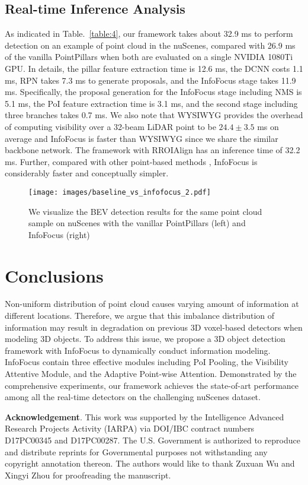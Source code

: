 \documentclass[runningheads]{llncs}
\begin{document}
\subsection{Real-time Inference Analysis}
As indicated in Table.~\ref{table:4}, our framework takes about 32.9 ms to perform detection on an example of point cloud in the nuScenes, compared with 26.9 ms of the vanilla PointPillars when both are evaluated on a single NVIDIA 1080Ti GPU. In details, the pillar feature extraction time is 12.6 ms, the DCNN costs 1.1 ms, RPN takes 7.3 ms to generate proposals, and the InfoFocus stage takes 11.9 ms. Specifically, the proposal generation for the InfoFocus stage including NMS is 5.1 ms, the PoI feature extraction time is 3.1 ms, and the second stage including three branches takes 0.7 ms. We also note that WYSIWYG \cite{hu2019you} provides the overhead of computing visibility over a 32-beam LiDAR point to be $24.4 \pm 3.5$ ms on average and InfoFocus is faster than WYSIWYG \cite{hu2019you} since we share the similar backbone network. The framework with RROIAlign has an inference time of 32.2 ms. Further, compared with other point-based methods \cite{shi2019pointrcnn,yang2019std}, InfoFocus is considerably faster and conceptually simpler. 

\begin{figure}[t]
\centering
  \texttt{[image: images/baseline\_vs\_infofocus\_2.pdf]}
  \\
  \caption{We visualize the BEV detection results for the same point cloud sample on nuScenes with the vanillar PointPillars (left) and InfoFocus (right)}
\label{fig:comparison}
\end{figure}

\section{Conclusions}
Non-uniform distribution of point cloud causes varying amount of information at different locations. Therefore, we argue that this imbalance distribution of information may result in degradation on previous 3D voxel-based detectors when modeling 3D objects. To address this issue, we propose a 3D object detection framework with InfoFocus to dynamically conduct information modeling. InfoFocus contain three effective modules including PoI Pooling, the Visibility Attentive Module, and the Adaptive Point-wise Attention. Demonstrated by the comprehensive experiments, our framework achieves the state-of-art performance among all the real-time detectors on the challenging nuScenes dataset.

\noindent\textbf{Acknowledgement}. This work was supported by the Intelligence Advanced Research Projects Activity (IARPA) via DOI/IBC contract numbers D17PC00345 and D17PC00287. The U.S. Government is authorized to reproduce and distribute reprints for Governmental purposes not withstanding any copyright annotation thereon. The authors would like to thank Zuxuan Wu and Xingyi Zhou for proofreading the manuscript.




\clearpage


\end{document}
